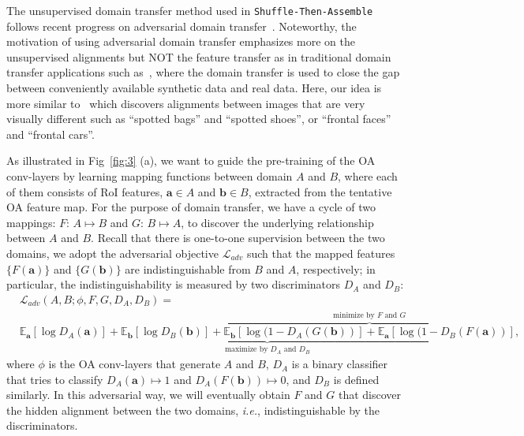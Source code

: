 \documentclass[runningheads]{llncs}
\newcommand{\ie}{\textit{i.e.}}
\begin{document}
The unsupervised domain transfer method used in \texttt{Shuffle-Then-Assemble} follows recent progress on adversarial domain transfer~\cite{zhu2017unpaired,kim2017learning,hoffman2017cycada,yi2017dualgan,chen2018zero}. Noteworthy, the motivation of using adversarial domain transfer emphasizes more on the unsupervised alignments but NOT the feature transfer as in traditional domain transfer applications such as~\cite{tsai2018learning}, where the domain transfer is used to close the gap between conveniently available synthetic data and real data. Here, our idea is more similar to~\cite{radford2015unsupervised} which discovers alignments between images that are very visually different such as ``spotted bags'' and ``spotted shoes'', or ``frontal faces'' and ``frontal cars''.

As illustrated in Fig~\ref{fig:3} (a), we want to guide the pre-training of the OA conv-layers by learning mapping functions between domain $A$ and $B$, where each of them consists of RoI features, $\mathbf{a}\in A$ and $\mathbf{b}\in B$, extracted from the tentative OA feature map. For the purpose of domain transfer, we have a cycle of two mappings: $F$: $A\mapsto B$ and $G$: $B\mapsto A$, to discover the underlying relationship between $A$ and $B$. Recall that there is one-to-one supervision between the two domains, we adopt the adversarial objective $\mathcal{L}_{adv}$ such that the mapped features $\{F(\mathbf{a})\}$ and $\{G(\mathbf{b})\}$ are indistinguishable from $B$ and $A$, respectively; in particular, the indistinguishability is measured by two discriminators $D_A$ and $D_B$:
\begin{equation}\label{eq:2}
\begin{split}
&\mathcal{L}_{adv}(A, B; \phi, F, G, D_A, D_B) = \\
&\underbrace{\mathbb{E}_\mathbf{a}[\log D_A(\mathbf{a})] + \mathbb{E}_\mathbf{b}[\log D_B(\mathbf{b})]+\overbrace{\mathbb{E}_\mathbf{b}[\log(1-D_A(G(\mathbf{b}))]+\mathbb{E}_\mathbf{a}[\log(1-D_B(F(\mathbf{a}))]}^{\text{minimize by $F$ and $G$}}}_{\text{maximize by $D_A$ and $D_B$}},
\end{split}
\end{equation}
where $\phi$ is the OA conv-layers that generate $A$ and $B$, $D_A$ is a binary classifier that tries to classify $D_A(\mathbf{a})\mapsto 1$ and $D_A(F(\mathbf{b}))\mapsto 0$, and $D_B$ is defined similarly. In this adversarial way, we will eventually obtain $F$ and $G$ that discover the hidden alignment between the two domains, \ie, indistinguishable by the discriminators.
\end{document}
